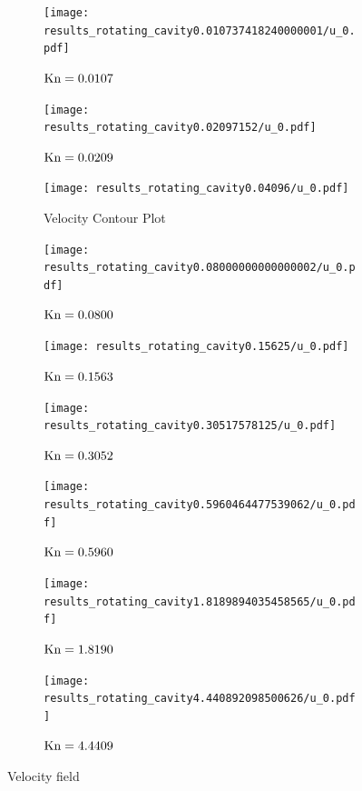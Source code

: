 \documentclass{article}
\begin{document}
\begin{figure}[ht]
  \centering
  \begin{subfigure}{0.36\textwidth}
    \texttt{[image: results\_rotating\_cavity0.010737418240000001/u\_0.pdf]}
    \caption{\(\textnormal{Kn} = 0.0107\)}
  \end{subfigure}
  \hspace{-1.0cm}
  \begin{subfigure}{0.36\textwidth}
    \texttt{[image: results\_rotating\_cavity0.02097152/u\_0.pdf]}
    \caption{\(\textnormal{Kn} = 0.0209\)}
  \end{subfigure}
  \hspace{-1.0cm}
  \begin{subfigure}{0.36\textwidth}
    \texttt{[image: results\_rotating\_cavity0.04096/u\_0.pdf]}
    \caption{Velocity Contour Plot}
  \end{subfigure}
  \begin{subfigure}{0.36\textwidth}
    \texttt{[image: results\_rotating\_cavity0.08000000000000002/u\_0.pdf]}
    \caption{\(\textnormal{Kn} = 0.0800\)}
  \end{subfigure}
  \hspace{-1.0cm}
  \begin{subfigure}{0.36\textwidth}
    \texttt{[image: results\_rotating\_cavity0.15625/u\_0.pdf]}
    \caption{\(\textnormal{Kn} = 0.1563\)}
  \end{subfigure}
  \hspace{-1.0cm}
  \begin{subfigure}{0.36\textwidth}
    \texttt{[image: results\_rotating\_cavity0.30517578125/u\_0.pdf]}
    \caption{\(\textnormal{Kn} = 0.3052\)}
  \end{subfigure}
  \begin{subfigure}{0.36\textwidth}
    \texttt{[image: results\_rotating\_cavity0.5960464477539062/u\_0.pdf]}
    \caption{\(\textnormal{Kn} = 0.5960\)}
  \end{subfigure}
  \hspace{-1.0cm}
  \begin{subfigure}{0.36\textwidth}
    \texttt{[image: results\_rotating\_cavity1.8189894035458565/u\_0.pdf]}
    \caption{\(\textnormal{Kn} = 1.8190\)}
  \end{subfigure}
  \hspace{-1.0cm}
  \begin{subfigure}{0.36\textwidth}
    \texttt{[image: results\_rotating\_cavity4.440892098500626/u\_0.pdf]}
    \caption{\(\textnormal{Kn} = 4.4409\)}
  \end{subfigure}
  \caption{Velocity field}\label{fig:velocity_fields}
\end{figure}
\end{document}
